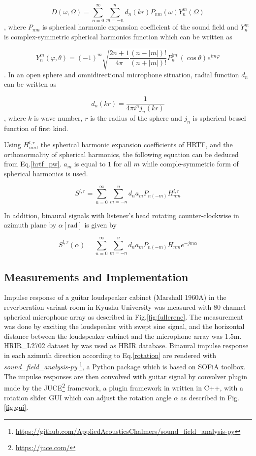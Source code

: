 \documentclass[convention,e-brief]{aesconf-current}
\begin{document}
\begin{equation}
    D\left(\omega, \Omega\right)=\sum_{n=0}^{\infty} \sum_{m=-n}^{n} d_{n}(k r) P_{n m}(\omega) Y_{n}^{m}\left(\Omega\right)
\end{equation}
, where $P_{nm}$ is spherical harmonic expansion coefficient of the sound field and $Y^{m}_n$ is complex-symmetric spherical harmonics function which can be written as

$$
    Y_{n}^{m}(\varphi, \theta) =(-1)^{m} \sqrt{\frac{2 n+1}{4 \pi} \frac{(n-|m|) !}{(n+|m|) !}} P_{n}^{|m|}(\cos \theta) e^{i m \varphi}
$$
.
In an open sphere and omnidirectional microphone situation, radial function $d_n$ can be written as

$$
    d_{n}(kr)=\frac{1}{4 \pi i^{n} j_{n}\left(k r\right)}
$$
, where $k$ is wave number, $r$ is the radius of the sphere and $j_n$ is spherical bessel function of first kind.

Using $H_{nm}^{l,r}$, the spherical harmonic expansion coefficients of HRTF, and the orthonormality of spherical harmonics, the following equation can be deduced from Eq.\ref{hrtf_pw}. $a_{m}$ is equal to $1$ for all $m$ while comple-symmetric form of spherical harmonics is used.

\begin{equation}
    \label{binaural_signal}
    S^{l, r} =\sum_{n=0}^{\infty} \sum_{m=-n}^{n} d_{n} a_{m} P_{n(-m)} H_{n m}^{l,r}
\end{equation}

In addition, binaural signals with listener's head rotating counter-clockwise in azimuth plane by $\alpha[\mathrm{rad}]$ is given by

\begin{equation}
    \label{rotation}
    S^{l, r}(\alpha)=\sum_{n=0}^{\infty} \sum_{m=-n}^{n} d_{n} a_{m} P_{n(-m)} H_{n m} e^{-j m \alpha}
\end{equation}

\subsection{Measurements and Implementation}

Impulse response of a guitar loudspeaker cabinet (Marshall 1960A) in the reverberation variant room in Kyushu University was measured with 80 channel spherical microphone array as described in Fig.\ref{fig:fullerene}.
The measurement was done by exciting the loudspeaker with swept sine signal, and the horizontal distance between the loudspeaker cabinet and the microphone array was 1.5m.
HRIR\_L2702 dataset by \citet{Bernschutz2013-zy} was used as HRIR database.
Binaural impulse response in each azimuth direction according to Eq.\ref{rotation} are rendered with \emph{sound\_field\_analysis-py} \footnote{\url{https://github.com/AppliedAcousticsChalmers/sound_field_analysis-py}}, a Python package which is based on SOFiA toolbox\cite{Bernschutz2011-rj}.
The impulse responses are then convolved with guitar signal by convolver plugin made by the JUCE\footnote{\url{https://juce.com/}} framework, a plugin framework in written in C++, with a rotation slider GUI which can adjust the rotation angle $\alpha$ as described in Fig.\ref{fig:gui}.
\end{document}
